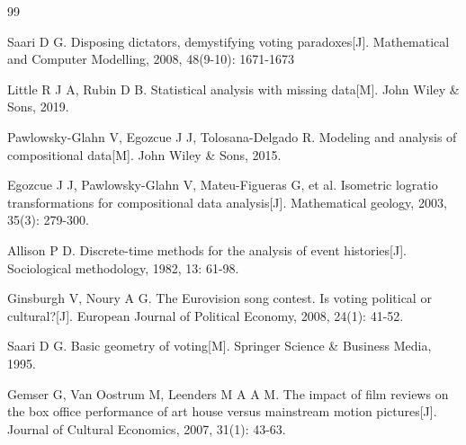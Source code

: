 \newpage

\begin{thebibliography}{99}

Saari D G. Disposing dictators, demystifying voting paradoxes[J]. Mathematical and Computer Modelling, 2008, 48(9-10): 1671-1673 

Little R J A, Rubin D B. Statistical analysis with missing data[M]. John Wiley \& Sons, 2019. 

Pawlowsky-Glahn V, Egozcue J J, Tolosana-Delgado R. Modeling and analysis of compositional data[M]. John Wiley \& Sons, 2015. 

Egozcue J J, Pawlowsky-Glahn V, Mateu-Figueras G, et al. Isometric logratio transformations for compositional data analysis[J]. Mathematical geology, 2003, 35(3): 279-300. 

Allison P D. Discrete-time methods for the analysis of event histories[J]. Sociological methodology, 1982, 13: 61-98. 

Ginsburgh V, Noury A G. The Eurovision song contest. Is voting political or cultural?[J]. European Journal of Political Economy, 2008, 24(1): 41-52. 

Saari D G. Basic geometry of voting[M]. Springer Science \& Business Media, 1995. 

Gemser G, Van Oostrum M, Leenders M A A M. The impact of film reviews on the box office performance of art house versus mainstream motion pictures[J]. Journal of Cultural Economics, 2007, 31(1): 43-63. 



\end{thebibliography}
